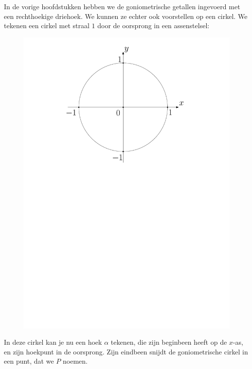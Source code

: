 In de vorige hoofdstukken hebben we de goniometrische getallen ingevoerd met een rechthoekige driehoek. We kunnen ze echter ook voorstellen op een cirkel. We tekenen een cirkel met straal $1$ door de oorsprong in een assenstelsel:
\begin{figure}[h]
\begin{center}
\includegraphics[scale=0.4]{3_gonio_complexe_getallen/inputs/goncirkelleeg.pdf}
\end{center}
\end{figure}

In deze cirkel kan je nu een hoek $\alpha$ tekenen, die zijn beginbeen heeft op de $x$-as, en zijn hoekpunt in de oorsprong. Zijn eindbeen snijdt de goniometrische cirkel in een punt, dat we $P$ noemen.

